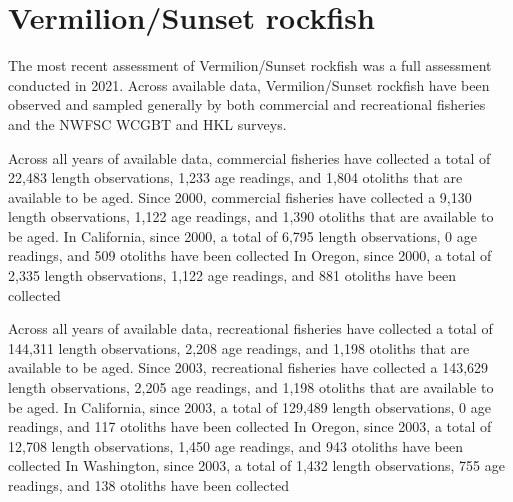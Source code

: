 \documentclass[11pt,
  english,
  letterpaper,
]{article}
\begin{document}

\hypertarget{vermilionsunset-rockfish}{%
\section{Vermilion/Sunset rockfish}\label{vermilionsunset-rockfish}}

\leavevmode\tagmcend\tagstructend


The most recent assessment of Vermilion/Sunset rockfish was a full assessment conducted in 2021. Across available data, Vermilion/Sunset rockfish have been observed and sampled generally by both commercial and recreational fisheries and the NWFSC WCGBT and HKL surveys.

\leavevmode\tagmcend\tagstructend\par


Across all years of available data, commercial fisheries have collected a total of 22,483 length observations, 1,233 age readings, and 1,804 otoliths that are available to be aged. Since 2000, commercial fisheries have collected a 9,130 length observations, 1,122 age readings, and 1,390 otoliths that are available to be aged. In California, since 2000, a total of 6,795 length observations, 0 age readings, and 509 otoliths have been collected In Oregon, since 2000, a total of 2,335 length observations, 1,122 age readings, and 881 otoliths have been collected

\leavevmode\tagmcend\tagstructend\par


Across all years of available data, recreational fisheries have collected a total of 144,311 length observations, 2,208 age readings, and 1,198 otoliths that are available to be aged. Since 2003, recreational fisheries have collected a 143,629 length observations, 2,205 age readings, and 1,198 otoliths that are available to be aged. In California, since 2003, a total of 129,489 length observations, 0 age readings, and 117 otoliths have been collected In Oregon, since 2003, a total of 12,708 length observations, 1,450 age readings, and 943 otoliths have been collected In Washington, since 2003, a total of 1,432 length observations, 755 age readings, and 138 otoliths have been collected
\end{document}
